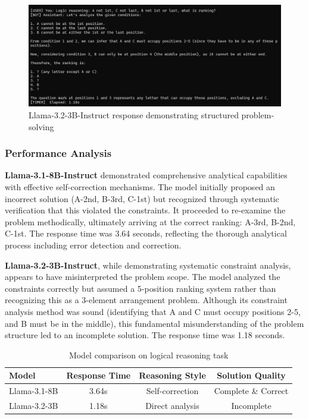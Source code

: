 \documentclass[12pt,a4paper]{article}
\begin{document}
\begin{figure}[H]
    \centering
    \includegraphics[width=0.95\linewidth]{Figures/3.2-3B ans.png}
    \caption{Llama-3.2-3B-Instruct response demonstrating structured problem-solving}
    \label{fig:llama32_reasoning}
\end{figure}

\subsubsection{Performance Analysis}

\textbf{Llama-3.1-8B-Instruct} demonstrated comprehensive analytical capabilities with effective self-correction mechanisms. The model initially proposed an incorrect solution (A-2nd, B-3rd, C-1st) but recognized through systematic verification that this violated the constraints. It proceeded to re-examine the problem methodically, ultimately arriving at the correct ranking: A-3rd, B-2nd, C-1st. The response time was 3.64 seconds, reflecting the thorough analytical process including error detection and correction.

\textbf{Llama-3.2-3B-Instruct}, while demonstrating systematic constraint analysis, appears to have misinterpreted the problem scope. The model analyzed the constraints correctly but assumed a 5-position ranking system rather than recognizing this as a 3-element arrangement problem. Although its constraint analysis method was sound (identifying that A and C must occupy positions 2-5, and B must be in the middle), this fundamental misunderstanding of the problem structure led to an incomplete solution. The response time was 1.18 seconds.

\begin{table}[H]
\centering
\caption{Model comparison on logical reasoning task}
\label{tab:model_reasoning_comparison}
\begin{tabular}{|l|c|c|c|}
\hline
\textbf{Model} & \textbf{Response Time} & \textbf{Reasoning Style} & \textbf{Solution Quality} \\
\hline
Llama-3.1-8B & 3.64s & Self-correction & Complete \& Correct \\
Llama-3.2-3B & 1.18s & Direct analysis & Incomplete \\
\hline
\end{tabular}
\end{table}
\end{document}
